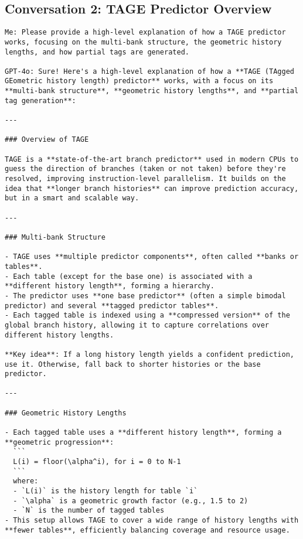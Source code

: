 \documentclass[sigconf, screen]{acmart}
\begin{document}
\subsection{Conversation 2: TAGE Predictor Overview}
\begin{Verbatim}[fontsize=\tiny, breaklines=true]
Me: Please provide a high-level explanation of how a TAGE predictor works, focusing on the multi-bank structure, the geometric history lengths, and how partial tags are generated.

GPT-4o: Sure! Here's a high-level explanation of how a **TAGE (TAgged GEometric history length) predictor** works, with a focus on its **multi-bank structure**, **geometric history lengths**, and **partial tag generation**:

---

### Overview of TAGE

TAGE is a **state-of-the-art branch predictor** used in modern CPUs to guess the direction of branches (taken or not taken) before they're resolved, improving instruction-level parallelism. It builds on the idea that **longer branch histories** can improve prediction accuracy, but in a smart and scalable way.

---

### Multi-bank Structure

- TAGE uses **multiple predictor components**, often called **banks or tables**.
- Each table (except for the base one) is associated with a **different history length**, forming a hierarchy.
- The predictor uses **one base predictor** (often a simple bimodal predictor) and several **tagged predictor tables**.
- Each tagged table is indexed using a **compressed version** of the global branch history, allowing it to capture correlations over different history lengths.

**Key idea**: If a long history length yields a confident prediction, use it. Otherwise, fall back to shorter histories or the base predictor.

---

### Geometric History Lengths

- Each tagged table uses a **different history length**, forming a **geometric progression**:
  ```
  L(i) = floor(\alpha^i), for i = 0 to N-1
  ```
  where:
  - `L(i)` is the history length for table `i`
  - `\alpha` is a geometric growth factor (e.g., 1.5 to 2)
  - `N` is the number of tagged tables
- This setup allows TAGE to cover a wide range of history lengths with **fewer tables**, efficiently balancing coverage and resource usage.


\end{Verbatim}
\end{document}
